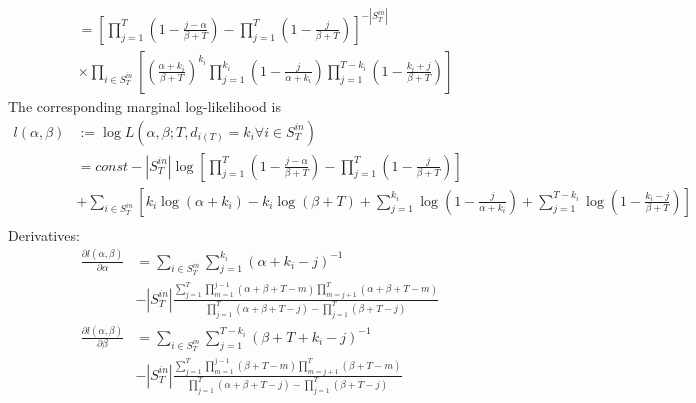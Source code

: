 \documentclass[a4paper, 12pt]{article}
\begin{document}
\begin{itemize}
\begin{align}
        &= \left[\prod_{j=1}^T \left(1 -\frac{j - \alpha}{\beta + T}\right) - \prod_{j=1}^T \left(1 - \frac{j}{\beta + T}\right)\right]^{-|S_T^{in}|} \nonumber \\
        &\times \prod_{i \in S_T^{in}} \left[\left(\frac{\alpha + k_i}{\beta + T}\right)^{k_i} \prod_{j=1}^{k_i}  \left(1 - \frac{j}{\alpha + k_i}\right) \prod_{j=1}^{T - k_i} \left(1 - \frac{k_i + j}{\beta + T}\right) \right]
    \end{align}
    The corresponding marginal log-likelihood is
    \begin{align}
        l(\alpha, \beta) &:= \log L(\alpha, \beta; T, d_{i(T)} = k_i \forall i \in S_T^{in}) \nonumber \\
        &= const - |S_T^{in}|\log\left[\prod_{j=1}^T (1 - \frac{j - \alpha}{\beta + T}) - \prod_{j=1}^T (1 - \frac{j}{\beta + T})\right] \nonumber \\
        &+ \sum_{i \in S_T^{in}} \left[k_i\log(\alpha + k_i) - k_i\log(\beta + T) + \sum_{j = 1}^{k_i} \log(1 - \frac{j}{\alpha + k_i}) + \sum_{j = 1}^{T - k_i} \log(1 - \frac{k_i - j}{\beta + T})\right] \nonumber \\
    \end{align}
    Derivatives:
    \begin{align}
        \frac{\partial l(\alpha, \beta)}{\partial \alpha} &= \sum_{i \in S_T^{in}} \sum_{j = 1}^{k_i} (\alpha + k_i - j)^{-1} \nonumber \\
        &- |S_T^{in}|\frac{\sum_{j = 1}^T \prod_{m = 1}^{j - 1} (\alpha + \beta + T - m) \prod_{m = j + 1}^T (\alpha + \beta + T - m)}{\prod_{j=1}^T (\alpha + \beta + T - j) - \prod_{j=1}^T (\beta + T - j)}\\
        \frac{\partial l(\alpha, \beta)}{\partial \beta} &= \sum_{i \in S_T^{in}} \sum_{j = 1}^{T - k_i} (\beta + T + k_i - j)^{-1} \nonumber \\
        &- |S_T^{in}|\frac{\sum_{j = 1}^T \prod_{m = 1}^{j - 1} (\beta + T - m) \prod_{m = j + 1}^T (\beta + T - m)}{\prod_{j=1}^T (\alpha + \beta + T - j) - \prod_{j=1}^T (\beta + T - j)}
    \end{align}
\end{itemize}
\end{document}

